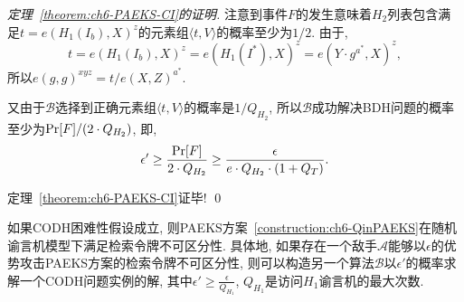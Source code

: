 \begin{proof}[定理~\ref{theorem:ch6-PAEKS-CI}的证明]
注意到事件$F$的发生意味着$H_2$列表包含满足$t = e(H_1(I_b), X)^z$的元素组$\langle t, V\rangle$的概率至少为$1/2$. 由于,
\[
t = e(H_1(I_b), X)^z = e(H_1(I^*), X)^z = e(Y\cdot g^{a^*}, X)^z,
\]
所以$e(g, g)^{xyz} = t/e(X, Z)^{a^*}$. 

又由于$\mathcal{B}$选择到正确元素组$\langle t, V\rangle$的概率是$1/Q_{H_2}$, 所以$\mathcal{B}$成功解决BDH问题的概率至少为$\textup{Pr}[F] / (2 \cdot Q_{H_2})$, 即,
\[
\epsilon' \geq \frac{\textup{Pr}[F]}{2 \cdot Q_{H_2}} \geq \frac{\epsilon}{e \cdot Q_{H_2} \cdot (1 + Q_T)}. 
\]

定理~\ref{theorem:ch6-PAEKS-CI}证毕! \qed
\end{proof}


\begin{theorem}\label{theorem:ch6-PAEKS-TI}
如果CODH困难性假设成立, 则PAEKS方案~\ref{construction:ch6-QinPAEKS}在随机谕言机模型下满足检索令牌不可区分性. 具体地, 如果存在一个敌手$\mathcal{A}$能够以$\epsilon$的优势攻击PAEKS方案的检索令牌不可区分性, 则可以构造另一个算法$\mathcal{B}$以$\epsilon'$的概率求解一个CODH问题实例的解, 其中$\epsilon'\geq \frac{\epsilon}{Q_{H_1}}$, $Q_{H_1}$是访问$H_1$谕言机的最大次数.
\end{theorem}
